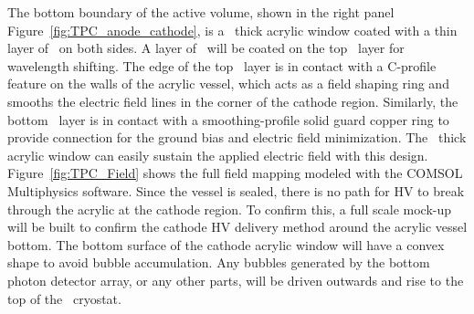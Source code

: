 The bottom boundary of the active volume, shown in the right panel Figure~\ref{fig:TPC_anode_cathode}, is a \DSkPMMATPCThickness\ thick acrylic window coated with a thin layer of \Clevios\ on both sides. A layer of \TPB\ will be coated on the top \Clevios\ layer for wavelength shifting. The edge of the top \Clevios\ layer is in contact with a C-profile feature on the walls of the acrylic vessel, which acts as a field shaping ring and smooths the electric field lines in the corner of the cathode region. Similarly, the bottom \Clevios\ layer is in contact with a smoothing-profile solid guard copper ring to provide connection for the ground bias and electric field minimization. The  \DSkPMMATPCThickness\ thick acrylic window can easily sustain the applied electric field with this design. Figure~\ref{fig:TPC_Field} shows the full field mapping modeled with the COMSOL Multiphysics software. Since the vessel is sealed, there is no path for HV to break through the acrylic at the cathode region. To confirm this, a full scale mock-up will be built to confirm the cathode HV delivery method around the acrylic vessel bottom.   The bottom surface of the cathode acrylic window will have a convex shape to avoid bubble accumulation.  Any bubbles generated by the bottom photon detector array, or any other parts, will be driven outwards and rise to the top of the \AAr\ cryostat.


